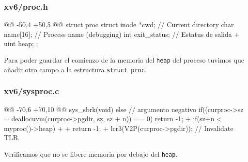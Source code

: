 \subsubsection{xv6/proc.h}
\begin{listing}
@@ -50,4 +50,5 @@ struct proc {
        struct inode *cwd;           // Current directory
        char name[16];               // Process name (debugging)
        int exit_status;             // Estatus de salida
+       uint heap;   
    };
\end{listing}
\par Para poder guardar el comienzo de la memoria del \texttt{heap} del proceso tuvimos que añadir otro campo a la estructura \texttt{struct proc}.

\subsubsection{xv6/sysproc.c}
\begin{listing}
@@ -70,6 +70,10 @@ sys_sbrk(void)
    else // argumento negativo
    {
        if((curproc->sz = deallocuvm(curproc->pgdir, sz, sz + n)) == 0)
            return -1;
+       if(sz+n < myproc()->heap)
+       {
+           return -1;
+       }
    }
    lcr3(V2P(curproc->pgdir));  // Invalidate TLB.
\end{listing}

\par Verificamos que no se libere memoria por debajo del \texttt{heap}.